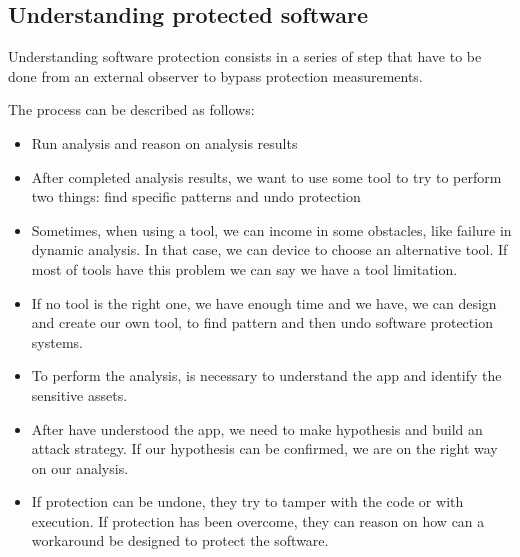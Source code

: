 \subsection{Understanding protected software}

Understanding software protection consists in a series of step that have to be done from an external observer to bypass protection measurements. \newline

The process can be described as follows:
\begin{itemize}
    \item Run analysis and reason on analysis results
    \item After completed analysis results, we want to use some tool to try to perform two things: find specific patterns and undo protection
    \item Sometimes, when using a tool, we can income in some obstacles, like failure in dynamic analysis. In that case, we can device to choose an alternative tool. If most of tools have this problem we can say we have a tool limitation. 
    \item If no tool is the right one, we have enough time and we have, we can design and create our own tool, to find pattern and then undo software protection systems.
    \item To perform the analysis, is necessary to understand the app and identify the sensitive assets. 
    \item After have understood the app, we need to make hypothesis and build an attack strategy. If our hypothesis can be confirmed, we are on the right way on our analysis. 
    \item If protection can be undone, they try to tamper with the code or with execution. If protection has been overcome, they can reason on how can a workaround be designed to protect the software. 
\end{itemize}

